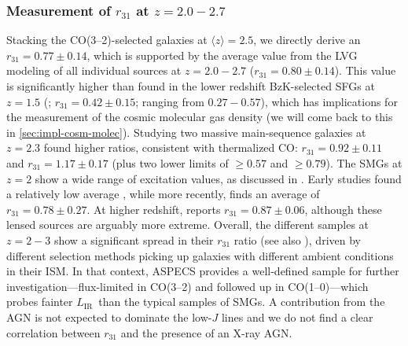 \documentclass[twocolumn]{aastex62}
\newcommand{\LIR}{\ensuremath{L_{\mathrm{IR}}}}
\newcommand{\avg}[1]{\ensuremath{\langle #1 \rangle}}
\newcommand{\rThreeOneLVGzHiTwo}{\ensuremath{0.80 \pm 0.14}}
\newcommand{\rThreeOnestack}{\ensuremath{0.77 \pm 0.14}}
\begin{document}
\subsubsection{Measurement of $r_{31}$ at $z=2.0-2.7$}
\label{sec:measurements-r31}
Stacking the CO(3--2)-selected galaxies at $\avg{z}=2.5$, we directly derive an
$r_{31} = \rThreeOnestack$, which is supported by the average value from the
LVG modeling of all individual sources at $z=2.0 - 2.7$
($r_{31} = \rThreeOneLVGzHiTwo$).  This value is significantly higher than
found in the lower redshift BzK-selected SFGs at $z=1.5$ (\citealt{Daddi2015};
$r_{31} = 0.42 \pm 0.15$; ranging from $0.27 - 0.57$), which has implications
for the measurement of the cosmic molecular gas density (we will come back to
this in \autoref{sec:impl-cosm-molec}).  Studying two massive main-sequence
galaxies at $z=2.3$ \cite{Bolatto2015} found higher ratios, consistent with
thermalized CO: $r_{31} = 0.92\pm0.11$ and $r_{31} = 1.17\pm 0.17$ (plus two
lower limits of $\ge 0.57$ and $\ge 0.79$).  The SMGs at $z=2$ show a wide
range of excitation values, as discussed in \cite{Riechers2020b}.  Early
studies found a relatively low average \citep[$r_{31} = 0.52 \pm 0.09$
][]{Ivison2011, Bothwell2013}, while more recently, \cite{Sharon2016} finds an
average of $r_{31} = 0.78\pm0.27$.  At higher redshift, \cite{Spilker2014}
reports $r_{31} = 0.87 \pm 0.06$, although these lensed sources are arguably
more extreme.  Overall, the different samples at $z=2-3$ show a significant
spread in their $r_{31}$ ratio (see also \citealt{Riechers2020b}), driven by
different selection methods picking up galaxies with different ambient
conditions in their ISM.  In that context, ASPECS provides a well-defined
sample for further investigation---flux-limited in CO(3--2) and followed up in
CO(1--0)---which probes fainter \LIR\ than the typical samples of SMGs.  A
contribution from the AGN is not expected to dominate the low-$J$ lines and we
do not find a clear correlation between $r_{31}$ and the presence of an X-ray
AGN.
\end{document}
